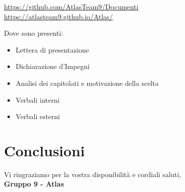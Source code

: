 \documentclass[a4paper,12pt]{article}
\begin{document}
\begin{center}
    \url{https://github.com/AtlasTeam9/Documenti} \\
    \url{https://atlasteam9.github.io/Atlas/}
\end{center}

Dove sono presenti:
\begin{itemize}
    \item Lettera di presentazione
    \item Dichiarazione d'Impegni
    \item Analisi dei capitolati e motivazione della scelta
    \item Verbali interni
    \item Verbali esterni
\end{itemize}

\section*{Conclusioni}
Vi ringraziamo per la vostra disponibilità e cordiali saluti, \\
\textbf{Gruppo 9 - Atlas}
\end{document}
